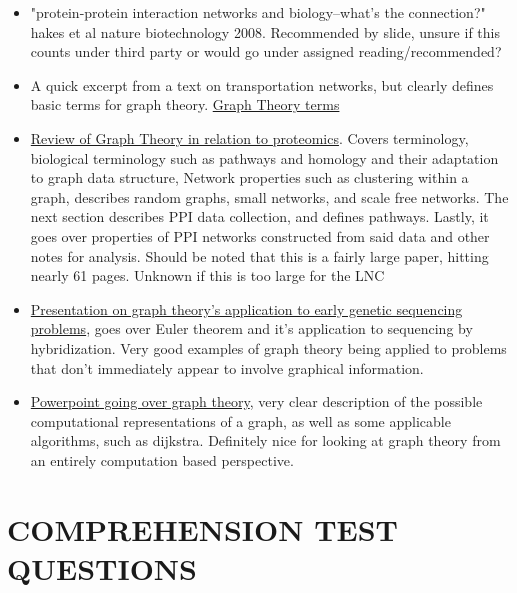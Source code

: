 \documentclass[11pt]{article}
\begin{document}
\begin{itemize}
\item "protein-protein interaction networks and biology--what's the connection?" hakes et al nature biotechnology 2008. Recommended by slide, unsure if this counts under third party or would go under assigned reading/recommended?
\item A quick excerpt from a text on transportation networks, but clearly defines basic terms for graph theory.
\href{http://people.hofstra.edu/geotrans/eng/methods/ch1m2en.html}{Graph Theory terms}
\item \href{http://www.doc.ic.ac.uk/~natasha/book_chpt5_GT_NP.pdf}{Review of Graph Theory in relation to proteomics}. 
Covers terminology, biological terminology such as pathways and homology and their adaptation to graph data structure, Network properties such as clustering within a graph, describes random graphs, small networks, and scale free networks. The next section describes PPI data collection, and defines pathways. Lastly, it goes over properties of PPI networks constructed from said data and other notes for analysis. Should be noted that this is a fairly large paper, hitting nearly 61 pages. 
Unknown if this is too large for the LNC
\item \href{http://bix.ucsd.edu/bioalgorithms/presentations/Ch08_GraphsDNAseq.pdf}{Presentation on graph theory's application to early genetic sequencing problems},
goes over Euler theorem and it's application to sequencing by hybridization. 
Very good examples of graph theory being applied to problems that don't 
immediately appear to involve graphical information.
\item \href{http://bix.ucsd.edu/bioalgorithms/presentations/Ch08_GraphsDNAseq.pdf}{Powerpoint going over graph theory}, 
  very clear description of the possible computational representations of a graph, 
  as well as some applicable algorithms, such as dijkstra. 
  Definitely nice for looking at graph theory from an entirely computation based perspective.
\end{itemize}

\section*{COMPREHENSION TEST QUESTIONS}
\end{document}
